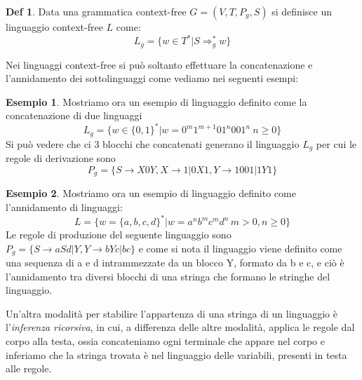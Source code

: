 \documentclass[a4paper]{book}
\theoremstyle{definition}%
\newtheorem*{defi}{Def}%
\newtheorem*{esempio}{Esempio}
\begin{document}
  \begin{defi}
    Data una grammatica context-free $G = (V, T, P_g, S)$ si definisce un linguaggio context-free $L$ come:
    \begin{equation*}
      L_g = \{ w \in T^* | S \Rightarrow _g ^* w \}
    \end{equation*}
  \end{defi}

  Nei linguaggi context-free si può soltanto effettuare la concatenazione e l'annidamento dei sottolinguaggi come vediamo
  nei seguenti esempi:
  
  \begin{esempio}
  Mostriamo ora un esempio di linguaggio definito come la concatenazione di due linguaggi
  \begin{equation*}
     L_g = \{ w \in \{0,1\}^* | w = 0^m 1^{m+1}01^n001^n \ n\geq 0\}
  \end{equation*}
  Si può vedere che ci 3 blocchi che concatenati generano il linguaggio $L_g$ per cui le regole di derivazione sono
  \[ P_g = \{S \to X0Y, X \to 1 | 0X1, Y \to 1001 | 1Y1\} \]
  \end{esempio}
  \begin{esempio}
    Mostriamo ora un esempio di linguaggio definito come l'annidamento di linguaggi:
    \begin{equation*}
      L = \{ w = \{a,b,c,d\}^* | w = a^nb^mc^md^n \, m > 0, n \geq 0\}
    \end{equation*}
    Le regole di produzione del seguente linguaggio sono $P_g = \{S \to aSd | Y, Y \to bYc | bc\}$
    e come si nota il linguaggio viene definito come una sequenza di a e d intrammezzate da un blocco Y, formato da b e c,
    e ciò è l'annidamento tra diversi blocchi di una stringa che formano le stringhe del linguaggio.
  \end{esempio}

  Un'altra modalità per stabilire l'appartenza di una stringa di un linguaggio è l'\emph{inferenza ricorsiva}, in cui, a differenza delle altre
  modalità, applica le regole dal corpo alla testa, ossia concateniamo ogni terminale che appare nel corpo e inferiamo che la stringa trovata
  è nel linguaggio delle variabili, presenti in testa alle regole.
\end{document}
